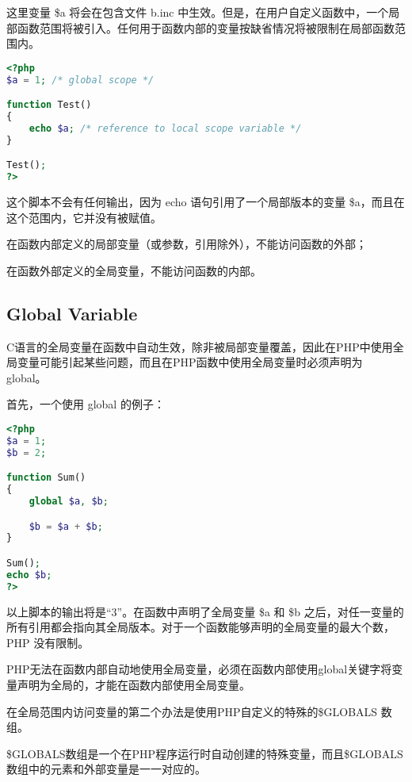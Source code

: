 这里变量 \$a 将会在包含文件 b.inc 中生效。但是，在用户自定义函数中，一个局部函数范围将被引入。任何用于函数内部的变量按缺省情况将被限制在局部函数范围内。

\begin{lstlisting}[language=PHP]
<?php
$a = 1; /* global scope */

function Test()
{
    echo $a; /* reference to local scope variable */
}

Test();
?>
\end{lstlisting}

这个脚本不会有任何输出，因为 echo 语句引用了一个局部版本的变量 \$a，而且在这个范围内，它并没有被赋值。

\begin{compactitem}
\item 在函数内部定义的局部变量（或参数，引用除外），不能访问函数的外部；
\item 在函数外部定义的全局变量，不能访问函数的内部。
\end{compactitem}






\subsection{Global Variable}


C语言的全局变量在函数中自动生效，除非被局部变量覆盖，因此在PHP中使用全局变量可能引起某些问题，而且在PHP函数中使用全局变量时必须声明为 global。

首先，一个使用 global 的例子：


\begin{lstlisting}[language=PHP]
<?php
$a = 1;
$b = 2;

function Sum()
{
    global $a, $b;

    $b = $a + $b;
}

Sum();
echo $b;
?>
\end{lstlisting}

以上脚本的输出将是“3”。在函数中声明了全局变量 \$a 和 \$b 之后，对任一变量的所有引用都会指向其全局版本。对于一个函数能够声明的全局变量的最大个数，PHP 没有限制。

PHP无法在函数内部自动地使用全局变量，必须在函数内部使用global关键字将变量声明为全局的，才能在函数内部使用全局变量。



在全局范围内访问变量的第二个办法是使用PHP自定义的特殊的\$GLOBALS 数组。

\$GLOBALS数组是一个在PHP程序运行时自动创建的特殊变量，而且\$GLOBALS数组中的元素和外部变量是一一对应的。



